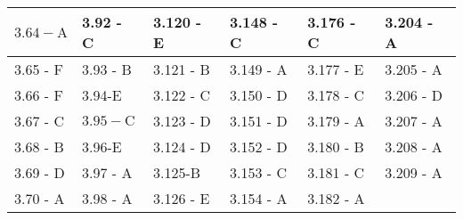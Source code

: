 \begin{center}
\begin{tabular}{|l|l|l|l|l|l|}
\hline
$3.64-\mathrm{A}$ & 3.92 - C & 3.120 - E & 3.148 - C & 3.176 - C & 3.204 - A \\
\hline
3.65 - F & 3.93 - B & 3.121 - B & 3.149 - A & 3.177 - E & 3.205 - A \\
\hline
3.66 - F & 3.94-E & 3.122 - C & 3.150 - D & 3.178 - C & 3.206 - D \\
\hline
3.67 - C & $3.95-\mathrm{C}$ & 3.123 - D & 3.151 - D & 3.179 - A & 3.207 - A \\
\hline
3.68 - B & 3.96-E & 3.124 - D & 3.152 - D & 3.180 - B & 3.208 - A \\
\hline
3.69 - D & 3.97 - A & 3.125-B & 3.153 - C & 3.181 - C & 3.209 - A \\
\hline
3.70 - A & 3.98 - A & 3.126 - E & 3.154 - A & 3.182 - A &  \\
\hline
\end{tabular}
\end{center}

